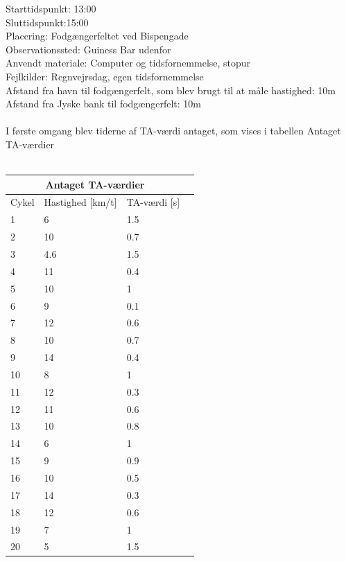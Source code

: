 Starttidspunkt: 13:00
~\\
Sluttidspunkt:15:00
~\\
Placering: Fodgængerfeltet ved Bispengade
~\\
Observationssted: Guiness Bar udenfor
~\\
Anvendt materiale: Computer og tidsfornemmelse, stopur
~\\
Fejlkilder: Regnvejrsdag, egen tidsfornemmelse
~\\
Afstand fra havn til fodgængerfelt, som blev brugt til at måle hastighed: 10m
~\\
Afstand fra Jyske bank til fodgængerfelt: 10m
~\\\\
I første omgang blev tiderne af TA-værdi antaget, som vises i tabellen Antaget TA-værdier
\\\\
\begin{tabular}{ |p{1cm}|p{4cm}|p{4cm}|p{4cm}|  }
\hline
\multicolumn{3}{|c|}{Antaget TA-værdier} \\
\hline
Cykel & Hastighed [km/t] & TA-værdi [s]  \\
\hline
1 & 6   & 1.5  \\
2 & 10  & 0.7  \\
3 & 4.6 & 1.5  \\
4 & 11  & 0.4  \\
5 & 10  & 1  \\
6 & 9   & 0.1 \\
7 & 12  & 0.6  \\
8 & 10  & 0.7  \\
9 & 14  & 0.4  \\
10 & 8  & 1  \\
11 & 12 & 0.3  \\
12 & 11 & 0.6 \\
13 & 10 & 0.8 \\
14 & 6  & 1 \\
15 & 9  & 0.9 \\
16 & 10 & 0.5 \\
17 & 14 & 0.3 \\
18 & 12 & 0.6 \\
19 & 7  & 1 \\
20 & 5  & 1.5 \\
\hline
\end{tabular}



